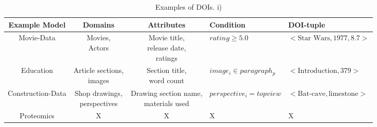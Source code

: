 \begin{table}[htbp]
	\centering
		\begin{tabular}{|c|c|c|l|l|}
			\hline
	Example Model & Domains & Attributes & Condition& DOI-tuple\\\hline
	Movie-Data & \shortstack{Movies,\\ Actors} & \shortstack{Movie title,\\ release date,\\ ratings}& $rating \geq 5.0$& $<\text{Star Wars}, 1977, 8.7>$ \\\hline
	Education & \shortstack{Article sections,\\ images} & \shortstack{Section title,\\ word count} & $image_i \in paragraph_p$& $<\text{Introduction}, 379>$ \\\hline
	Construction-Data & \shortstack{Shop drawings,\\ perspectives} & \shortstack{Drawing section name,\\ materials used} & $perspective_i =topview$& $<\text{Bat-cave}, \text{limestone}>$ \\\hline
	Proteomics & X& X& X& X \\\hline
		\end{tabular}
		\caption{Examples of DOIs. i)}
		\label{tab:ExampleDOI}
\end{table} 







